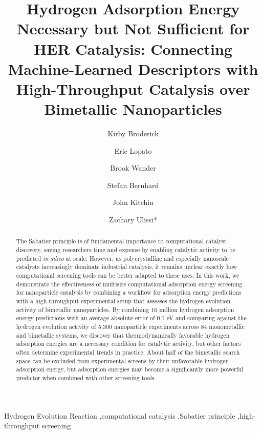 \documentclass[preprint,12pt]{elsarticle}
\begin{document}
\begin{frontmatter}

\title{Hydrogen Adsorption Energy Necessary but Not Sufficient for HER Catalysis: Connecting Machine-Learned Descriptors with High-Throughput Catalysis over Bimetallic Nanoparticles}

\author[add1]{Kirby Broderick}
\author[add2]{Eric Lopato}
\author[add1]{Brook Wander}

\author[add2]{Stefan Bernhard}
\author[add1]{John Kitchin}
\author[add1]{Zachary Ulissi*}
\address[add1]{Department of Chemical Engineering, Carnegie Mellon University, Pittsburgh PA}
\address[add2]{Department of Chemistry, Carnegie Mellon University, Pittsburgh PA}

\raggedright
\begin{abstract}
  The Sabatier principle is of fundamental importance to computational catalyst discovery, saving researchers time and expense by enabling catalytic activity to be predicted \emph{in silico} at scale. However, as polycrystalline and especially nanoscale catalysts increasingly dominate industrial catalysis, it remains unclear exactly how computational screening tools can be better adapted to these uses. In this work, we demonstrate the effectiveness of multisite computational adsorption energy screening for nanoparticle catalysis by combining a workflow for adsorption energy predictions with a high-throughput experimental setup that assesses the hydrogen evolution activity of bimetallic nanoparticles. By combining 16 million hydrogen adsorption energy predictions with an average absolute error of 0.1 eV and comparing against the hydrogen evolution activity of 5,300 nanoparticle experiments across 84 monometallic and bimetallic systems, we discover that thermodynamically favorable hydrogen adsorption energies are a necessary condition for catalytic activity, but other factors often determine experimental trends in practice. About half of the bimetallic search space can be excluded from experimental screens by their unfavorable hydrogen adsorption energy, but adsorption energies may become a significantly more powerful predictor when combined with other screening tools.
\end{abstract}

\begin{keyword}
Hydrogen Evolution Reaction \sep computational catalysis \sep Sabatier principle \sep high-throughput screening 
\end{keyword}

\end{frontmatter}
\end{document}
